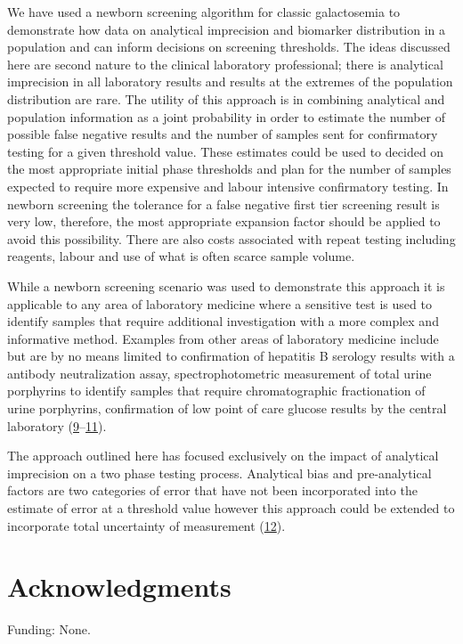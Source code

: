 \documentclass[review]{elsarticle}
\begin{document}
We have used a newborn screening algorithm for classic galactosemia to
demonstrate how data on analytical imprecision and biomarker
distribution in a population and can inform decisions on screening
thresholds. The ideas discussed here are second nature to the clinical
laboratory professional; there is analytical imprecision in all
laboratory results and results at the extremes of the population
distribution are rare. The utility of this approach is in combining
analytical and population information as a joint probability in order
to estimate the number of possible false negative results and the
number of samples sent for confirmatory testing for a given threshold
value. These estimates could be used to decided on the most
appropriate initial phase thresholds and plan for the number of
samples expected to require more expensive and labour intensive
confirmatory testing. In newborn screening the tolerance for a false
negative first tier screening result is very low, therefore, the most
appropriate expansion factor should be applied to avoid this
possibility. There are also costs associated with repeat testing
including reagents, labour and use of what is often scarce sample
volume.

While a newborn screening scenario was used to demonstrate this
approach it is applicable to any area of laboratory medicine where a
sensitive test is used to identify samples that require additional
investigation with a more complex and informative method. Examples
from other areas of laboratory medicine include but are by no means
limited to confirmation of hepatitis B serology results with a
antibody neutralization assay, spectrophotometric measurement of total
urine porphyrins to identify samples that require chromatographic
fractionation of urine porphyrins, confirmation of low point of care
glucose results by the central laboratory (\hyperlink{citeproc_bib_item_9}{9}–\hyperlink{citeproc_bib_item_11}{11}).

The approach outlined here has focused exclusively on the impact of
analytical imprecision on a two phase testing process. Analytical bias
and pre-analytical factors are two categories of error that have not
been incorporated into the estimate of error at a threshold value
however this approach could be extended to incorporate total
uncertainty of measurement (\hyperlink{citeproc_bib_item_12}{12}).

\section*{Acknowledgments}
\label{sec:org2149a2c}
Funding: None.
\end{document}
